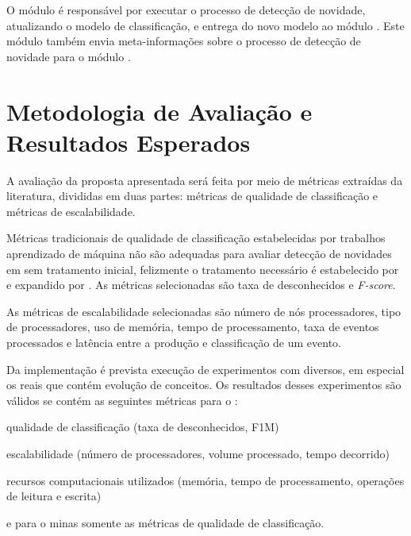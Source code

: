 O módulo \detector é responsável por executar o processo de detecção de
novidade, atualizando o modelo de classificação, e entrega do novo modelo
ao módulo \classify.
Este módulo também envia meta-informações sobre o processo de detecção de
novidade para o módulo \sink.

\section{Metodologia de Avaliação e Resultados Esperados}\label{sec:esperados}


A avaliação da proposta apresentada será feita por meio de métricas extraídas da
literatura, divididas em duas partes: métricas de qualidade de classificação
e métricas de escalabilidade.

Métricas tradicionais de qualidade de classificação estabelecidas por trabalhos
aprendizado de máquina não são adequadas para avaliar detecção de novidades em
\streams sem tratamento inicial, felizmente o tratamento necessário é
estabelecido por  e expandido por
.
As métricas selecionadas são taxa de desconhecidos e \emph{F-score}.

As métricas de escalabilidade selecionadas são número de nós processadores, tipo
de processadores, uso de memória, tempo de processamento, taxa de eventos
processados e latência entre a produção e classificação de um evento.

Da implementação \mfog é prevista execução de experimentos com \datasets
diversos, em especial os \datasets reais que contém evolução de conceitos.
Os resultados desses experimentos são válidos se contém as seguintes métricas
para o \mfog: \begin{enumerate*}[label={\alph*)}]
  \item qualidade de classificação (taxa de desconhecidos, F1M)
  \item escalabilidade (número de processadores, volume processado, tempo decorrido)
  \item recursos computacionais utilizados (memória, tempo de processamento, operações de leitura e escrita)
\end{enumerate*}
e para o minas somente as métricas de qualidade de classificação.

